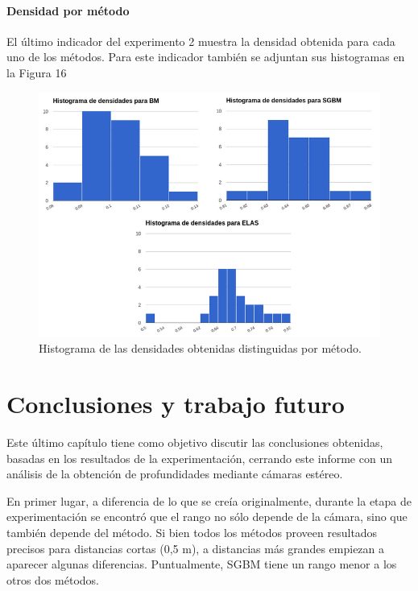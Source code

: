 \documentclass[11pt,a4paper,titlepage]{article}
\newcommand{\Figure}[1]{Figura #1}
\begin{document}
\paragraph{Densidad por método}
\hfill \break

El último indicador del experimento 2 muestra la densidad obtenida para cada uno de los métodos. Para este indicador también se adjuntan sus histogramas en la \Figure{16}


\begin{figure}[h!]

  \centering
    \includegraphics[width=1\textwidth]{f16.png}
  \caption{Histograma de las densidades obtenidas distinguidas por método.}
\end{figure}

\newpage

\section{Conclusiones y trabajo futuro}

Este último capítulo tiene como objetivo discutir las conclusiones obtenidas, basadas en los resultados de la experimentación, cerrando este informe con un análisis de la obtención de profundidades mediante cámaras estéreo.

En primer lugar, a diferencia de lo que se creía originalmente, durante la etapa de experimentación se encontró que el rango no sólo depende de la cámara, sino que también depende del método. Si bien todos los métodos proveen resultados precisos para distancias cortas (0,5 m), a distancias más grandes empiezan a aparecer algunas diferencias. Puntualmente, SGBM tiene un rango menor a los otros dos métodos.
\end{document}

